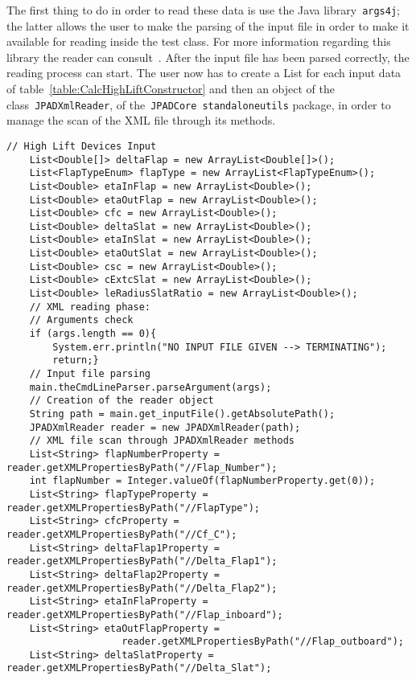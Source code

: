 \bigskip
\noindent
The first thing to do in order to read these data is use the Java library~\lstinline[language=Java]!args4j!; the latter allows the user to make the \gls{parsing} of the input file in order to make it available for reading inside the test class. For more information regarding this library the reader can consult~\cite{args4j}.
%
After the input file has been parsed correctly, the reading process can start. The user now has to create a \gls{List} for each input data of table~\ref{table:CalcHighLiftConstructor} and then an object of the class~\lstinline[language=Java]!JPADXmlReader!, of the~\lstinline[language=Java]!JPADCore!~\lstinline[language=Java]!standaloneutils! package, in order to manage the scan of the XML file through its methods. 

\bigskip
\begin{lstlisting}[caption={Excerpt of B747-100B test - Input data reading}, captionpos=b, tabsize=2]
	// High Lift Devices Input
	List<Double[]> deltaFlap = new ArrayList<Double[]>();
	List<FlapTypeEnum> flapType = new ArrayList<FlapTypeEnum>();
	List<Double> etaInFlap = new ArrayList<Double>();
	List<Double> etaOutFlap = new ArrayList<Double>();
	List<Double> cfc = new ArrayList<Double>();
	List<Double> deltaSlat = new ArrayList<Double>();
	List<Double> etaInSlat = new ArrayList<Double>();
	List<Double> etaOutSlat = new ArrayList<Double>();
	List<Double> csc = new ArrayList<Double>();
	List<Double> cExtcSlat = new ArrayList<Double>();
	List<Double> leRadiusSlatRatio = new ArrayList<Double>();
	// XML reading phase:
	// Arguments check
	if (args.length == 0){
		System.err.println("NO INPUT FILE GIVEN --> TERMINATING");
		return;}
	// Input file parsing
	main.theCmdLineParser.parseArgument(args);
	// Creation of the reader object
	String path = main.get_inputFile().getAbsolutePath();
	JPADXmlReader reader = new JPADXmlReader(path);
	// XML file scan through JPADXmlReader methods
	List<String> flapNumberProperty = reader.getXMLPropertiesByPath("//Flap_Number");
	int flapNumber = Integer.valueOf(flapNumberProperty.get(0));
	List<String> flapTypeProperty = reader.getXMLPropertiesByPath("//FlapType");
	List<String> cfcProperty = reader.getXMLPropertiesByPath("//Cf_C");
	List<String> deltaFlap1Property = reader.getXMLPropertiesByPath("//Delta_Flap1");
	List<String> deltaFlap2Property = reader.getXMLPropertiesByPath("//Delta_Flap2");
	List<String> etaInFlaProperty = reader.getXMLPropertiesByPath("//Flap_inboard");
	List<String> etaOutFlapProperty = 
					reader.getXMLPropertiesByPath("//Flap_outboard");
	List<String> deltaSlatProperty = reader.getXMLPropertiesByPath("//Delta_Slat");

\end{lstlisting}
